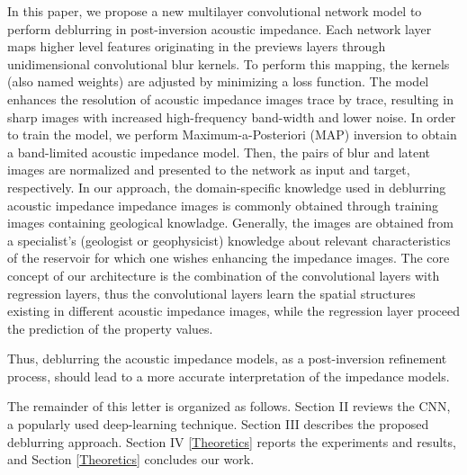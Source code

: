 \documentclass[journal]{IEEEtran}
\begin{document}
In this paper, we propose a new multilayer convolutional network model to perform deblurring in post-inversion acoustic impedance.
Each network layer maps higher level features originating in the previews layers through unidimensional convolutional blur kernels.
To perform this mapping, the kernels (also named weights) are adjusted by minimizing a loss function. 
The model enhances the resolution of acoustic impedance images trace by trace, resulting in sharp images with
increased high-frequency band-width and lower noise.
In order to train the model, we perform Maximum-a-Posteriori (MAP) inversion to obtain a band-limited acoustic impedance model.
Then, the pairs of blur and latent images are normalized and 
presented to the network as input and target, respectively.
In our approach, the domain-specific knowledge used in deblurring acoustic impedance impedance images is commonly
obtained through training images containing geological knowladge. Generally, the images are obtained from a specialist's
(geologist or geophysicist) knowledge about relevant characteristics of the reservoir for which one wishes enhancing the impedance images.
The core concept of our architecture is the combination of the convolutional layers with regression layers, thus the convolutional layers learn the spatial structures existing in different acoustic impedance images, while the regression layer proceed the prediction of the property values.

Thus, deblurring the acoustic impedance models, as a post-inversion refinement process, should lead to a more accurate
interpretation of the impedance models.

The remainder of this letter is organized as follows. Section II
reviews the CNN, a popularly used deep-learning technique.
Section III describes the proposed deblurring approach.
Section IV \ref{Theoretics} reports the experiments and results, and Section \ref{Theoretics}
concludes our work.



\end{document}
